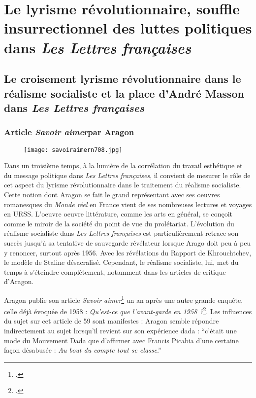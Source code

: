 \chapter{Le lyrisme révolutionnaire, souffle insurrectionnel des luttes politiques dans \emph{Les Lettres françaises} }

\section{Le croisement lyrisme révolutionnaire dans le réalisme socialiste et la place d’André Masson dans \emph{Les Lettres françaises}}

\subsection{Article \emph{Savoir aimer}par Aragon}
 
 \begin{figure}[H]
   \centering
   \texttt{[image: savoiraimern708.jpg]}
	\caption{\cite{savoiraimer}}\label{fig:Savoiraimer}
\end{figure}


Dans un troisième temps, à la lumière de la corrélation du travail esthétique et du message politique dans \emph{Les Lettres françaises}, il convient de mesurer le rôle de cet aspect du lyrisme révolutionnaire dans le traitement du réalisme socialiste. Cette notion dont Aragon se fait le grand représentant avec ses oeuvres romanesques du \emph{Monde réel} en France vient de ses nombreuses lectures et voyages en URSS. L'oeuvre oeuvre littérature, comme les arts en général, se conçoit comme le miroir de la société du point de vue du prolétariat. L'évolution du réalisme socialiste dans \emph{Les Lettres françaises} est particulièrement retrace son succès jusqu'à sa tentative de sauvegarde révélateur lorsque Arago doit peu à peu y renoncer, surtout après 1956. Avec les révélations du Rapport de Khrouchtchev, le modèle de Staline désacralisé. Cependant, le réalisme socialiste, lui, met du temps à s’éteindre complètement, notamment dans les articles de critique d’Aragon. 

	 Aragon publie son article \emph{Savoir aimer}\footcite{savoiraimer} un an après une autre grande enquête, celle déjà évoquée de 1958 : \emph{Qu’est-ce que l’avant-garde en 1958 ?}\footcite{avantgarde}. Les influences du sujet sur cet article de 59 sont manifestes : Aragon semble répondre indirectement au sujet lorsqu’il revient sur son expérience dada : \enquote{c’était une mode du Mouvement Dada que d’affirmer avec Francis Picabia d’une certaine façon désabusée : \emph{Au bout du compte tout se classe}.}



